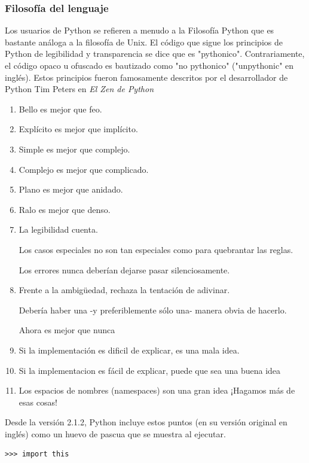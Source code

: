 \documentclass[a4paper]{report}
\begin{document}
\subsubsection*{Filosofía del lenguaje}

Los usuarios de Python se refieren a menudo a la Filosofía Python que es
bastante análoga a la filosofía de Unix. El código que sigue los principios de
Python de legibilidad y transparencia se dice que es "pythonico".
Contrariamente, el código opaco u ofuscado es bautizado como "no pythonico"
("unpythonic" en inglés). Estos principios fueron famosamente descritos por el
desarrollador de Python Tim Peters en \emph{El Zen de Python}

\begin{enumerate}
  \item Bello es mejor que feo.
  \item Explícito es mejor que implícito.
  \item Simple es mejor que complejo.
  \item Complejo es mejor que complicado.
  \item Plano es mejor que anidado.
  \item Ralo es mejor que denso.
  \item La legibilidad cuenta.
  \begin{item}
    Los casos especiales no son tan especiales como para quebrantar las reglas.
  \end{item}
  \begin{item}
    Los errores nunca deberían dejarse pasar silenciosamente.
  \end{item}
  \item {Frente a la ambigüedad, rechaza la tentación de adivinar.}
  \begin{item}
    Debería haber una -y preferiblemente sólo una- manera obvia de hacerlo. 
  \end{item}
  \begin{item}
    Ahora es mejor que nunca
  \end{item}
  \item {Si la implementación es dificil de explicar, es una mala idea.}
  \item {Si la implementacion es fácil de explicar, puede que sea una buena idea}
  \item {Los espacios de nombres (namespaces) son una gran idea ¡Hagamos más de esas cosas!}
\end{enumerate}
Desde la versión 2.1.2, Python incluye estos puntos (en su versión original en inglés) 
como un huevo de pascua que se muestra al ejecutar.
\begin{lstlisting}[style=consola]
>>> import this
\end{lstlisting}
\end{document}
